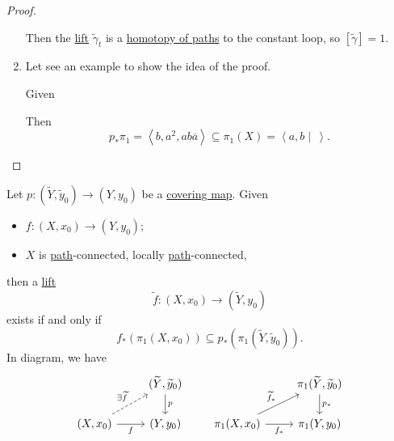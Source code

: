 \begin{proof}
\begin{enumerate}
		      \par Then the \hyperref[prop:homotopy-lifting-property]{lift} \(\widetilde{\gamma} _{t}\) is a \hyperref[def:homotopy-path]{homotopy of paths}
		      to the constant loop, so \([\widetilde{\gamma} ] = 1\).
		\item Let see an example to show the idea of the proof.
		      \begin{eg}
			      Given
			      \begin{figure}[H]
				      \centering
				      \label{fig:eg:lec14:2}
			      \end{figure}
		      \end{eg}
		      Then
		      \[
			      p_*\pi _1 = \left< b, a^{2} , ab \overline{a}  \right> \subseteq \pi _1(X) = \left< a, b \mid \ \right>.
		      \]
	\end{enumerate}
\end{proof}
\begin{proposition}\label{prop:lifting-criterion}
	Let \(p\colon (\widetilde{Y} , \widetilde{y} _0)\to (Y, y_0 )\) be a \hyperref[def:covering-map]{covering map}. Given
	\begin{itemize}
		\item \(f\colon (X, x_0) \to (Y, y_0)\);
		\item \(X\) is \hyperref[def:path]{path}-connected, locally \hyperref[def:path]{path}-connected,
	\end{itemize}
	then a \hyperref[prop:homotopy-lifting-property]{lift}
	\[
		\widetilde{f} \colon (X, x_0)\to (\widetilde{Y} , y_0)
	\]
	exists if and only if
	\[
		f_*\left(\pi _1(X, x_0)\right)\subseteq p_*(\pi _1(\widetilde{Y} , \widetilde{y} _0 )).
	\]
	In diagram, we have
	\[
		\begin{tikzcd}
			& {(\widetilde{Y}, \widetilde{y}_0)} \\
			{(X, x_0)} & {(Y, y_0)}
			\arrow["p", from=1-2, to=2-2]
			\arrow["f"', from=2-1, to=2-2]
			\arrow["{\exists \widetilde{f}}", dashed, from=2-1, to=1-2]
		\end{tikzcd}\qquad
		\begin{tikzcd}
			& {\pi_1(\widetilde{Y}, \widetilde{y}_0)} \\
			{\pi_1(X, x_0)} & {\pi_1(Y, y_0)}
			\arrow["{f_\ast}"', from=2-1, to=2-2]
			\arrow["{p_\ast}", from=1-2, to=2-2]
			\arrow["{\widetilde{f}_\ast}", from=2-1, to=1-2]
		\end{tikzcd}
	\]
\end{proposition}